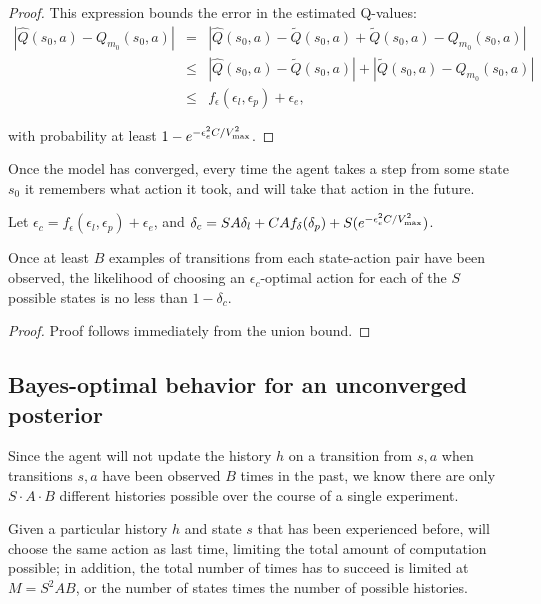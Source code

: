 \begin{proof}
This expression bounds the error in the estimated Q-values:
\begin{eqnarray}
\nonumber |\hat Q(s_0, a) - Q_{m_0}(s_0, a)| &=& |\hat Q(s_0, a) - \tilde Q(s_0, a) + \tilde Q(s_0, a) - Q_{m_0}(s_0, a)|\\
\nonumber &\leq& |\hat Q(s_0, a) - \tilde Q(s_0, a)| + |\tilde Q(s_0, a) - Q_{m_0}(s_0, a)|\\
 &\leq& f_\epsilon(\epsilon_l, \epsilon_p)+\epsilon_e,
\end{eqnarray}

with probability at least $1 - e^{-\epsilon_e^2 C / {V_{\rm max}^2}}$.

\end{proof}

Once the model has converged, every time the agent takes a step from some state $s_0$ it remembers what action it took, and will take that action in the future. 

Let $\epsilon_c = f_\epsilon(\epsilon_l, \epsilon_p)+\epsilon_e$, and $\delta_c = S A \delta_l + C A f_\delta(\delta_p) + S(e^{-\epsilon_e^2 C / {V_{\rm max}^2}})$.

\begin{lemma}
\label{sec:bfs3:lemma:converged}
Once at least $B$ examples of transitions from each state-action pair have been observed, the likelihood of  choosing an $\epsilon_c$-optimal action for each of the $S$ possible states is no less than $1-\delta_c$.
\end{lemma}
\begin{proof}
Proof follows immediately from the union bound.
\end{proof}

\subsection{Bayes-optimal behavior for an unconverged posterior}

Since the agent will not update the history $h$ on a transition from $s,a$ when transitions $s,a$ have been observed $B$ times in the past, we know there are only $S \cdot A \cdot B$ different histories possible over the course of a single experiment.

Given a particular history $h$ and state $s$ that has been experienced before,  will choose the same action as last time, limiting the total amount of computation possible; in addition, the total number of times  has to succeed is limited at $M = S^2 A B$, or the number of states times the number of possible histories.

